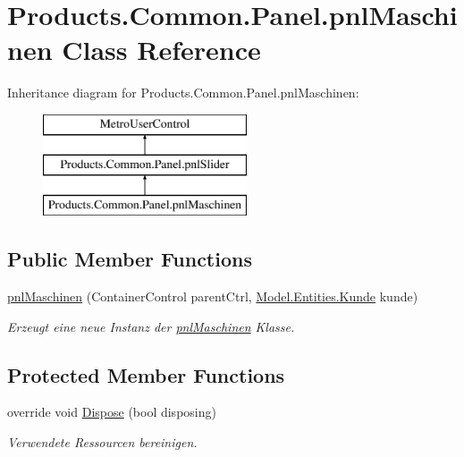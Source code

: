 \hypertarget{class_products_1_1_common_1_1_panel_1_1pnl_maschinen}{}\section{Products.\+Common.\+Panel.\+pnl\+Maschinen Class Reference}
\label{class_products_1_1_common_1_1_panel_1_1pnl_maschinen}
Inheritance diagram for Products.\+Common.\+Panel.\+pnl\+Maschinen\+:\begin{figure}[H]
\begin{center}
\leavevmode
\includegraphics[height=3.000000cm]{class_products_1_1_common_1_1_panel_1_1pnl_maschinen}
\end{center}
\end{figure}
\subsection*{Public Member Functions}
\begin{DoxyCompactItemize}
\item 
\hyperlink{class_products_1_1_common_1_1_panel_1_1pnl_maschinen_a2baa2ff1c2e91c6cb5ebdb9d3eb6fb03}{pnl\+Maschinen} (Container\+Control parent\+Ctrl, \hyperlink{class_products_1_1_model_1_1_entities_1_1_kunde}{Model.\+Entities.\+Kunde} kunde)
\begin{DoxyCompactList}\small\item\em Erzeugt eine neue Instanz der \hyperlink{class_products_1_1_common_1_1_panel_1_1pnl_maschinen}{pnl\+Maschinen} Klasse. \end{DoxyCompactList}\end{DoxyCompactItemize}
\subsection*{Protected Member Functions}
\begin{DoxyCompactItemize}
\item 
override void \hyperlink{class_products_1_1_common_1_1_panel_1_1pnl_maschinen_a976803b6c456645a68667b7300f19335}{Dispose} (bool disposing)
\begin{DoxyCompactList}\small\item\em Verwendete Ressourcen bereinigen. \end{DoxyCompactList}\end{DoxyCompactItemize}

